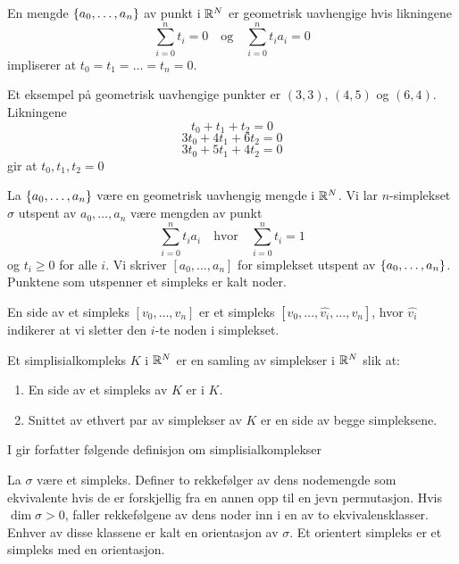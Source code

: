 \begin{definisjon}\label{def:GeoUav}
  En mengde $\left\{a_0,\dots,a_n\right\}$ av punkt i $\mathbb{R}^N$ er
  geometrisk uavhengige hvis likningene
  \[\sum_{i=0}^nt_i
  = 0\quad\text{og}\quad\sum_{i=0}^nt_ia_i=0\]
  impliserer at $t_0=t_1=\dots=t_n=0$.
\end{definisjon}

\begin{eksempel}
  Et eksempel på geometrisk uavhengige punkter er $(3,3)$, $(4,5)$ og $(6,4)$.
  Likningene
  \[t_0+t_1+t_2 = 0\]
  \[3t_0+4t_1+6t_2 = 0\]
  \[3t_0+5t_1+4t_2 = 0\]
  gir at $t_0,t_1,t_2 = 0$
\end{eksempel}

\begin{definisjon}\label{def:n-simp} 
  La $\left\{a_0,\dots,a_n\right\}$ være en geometrisk uavhengig mengde
  i $\mathbb{R}^N$. Vi lar $n$-simplekset $\sigma$ utspent av
  $a_0,\dots,a_n$ være mengden av punkt
  \[\sum_{i=0}^nt_ia_i\quad\text{hvor}\quad\sum_{i=0}^nt_i = 1\]
  og $t_i\geq0$ for alle $i$. Vi skriver $[a_0,\dots,a_n]$ for
  simplekset utspent av $\left\{a_0,\dots,a_n\right\}$. Punktene som utspenner et simpleks er kalt noder.
\end{definisjon}

\begin{definisjon}
  En side av et simpleks $[v_0,\dots,v_n]$ er et simpleks $[v_0,\dots,\hat{v_i},\dots,v_n]$, hvor $\hat{v_i}$ indikerer at vi sletter den $i$-te noden i simplekset. 
\end{definisjon}

\begin{definisjon}\label{def:SimpKomp}
  Et simplisialkompleks $K$ i $\mathbb{R}^N$ er en samling av simplekser
  i $\mathbb{R}^N$ slik at:
  \begin{enumerate}
    \item En side av et simpleks av $K$ er i $K$.\\
    \item Snittet av ethvert par av simplekser av $K$ er en side
      av begge simpleksene.
  \end{enumerate}
\end{definisjon}

I \citep[seksjon 5]{MunkresJamesR.2018EOAT} gir forfatter følgende
definisjon om simplisialkomplekser

\begin{definisjon}\label{def:Orientering}
  La $\sigma$ være et simpleks. Definer to rekkefølger av dens
  nodemengde som ekvivalente hvis de er forskjellig fra en annen
  opp til en jevn permutasjon. Hvis $\dim\sigma>0$, faller
  rekkefølgene av dens noder inn i en av to ekvivalensklasser.
  Enhver av disse klassene er kalt en orientasjon av $\sigma$. Et
  orientert simpleks er et simpleks med en orientasjon.
\end{definisjon}

